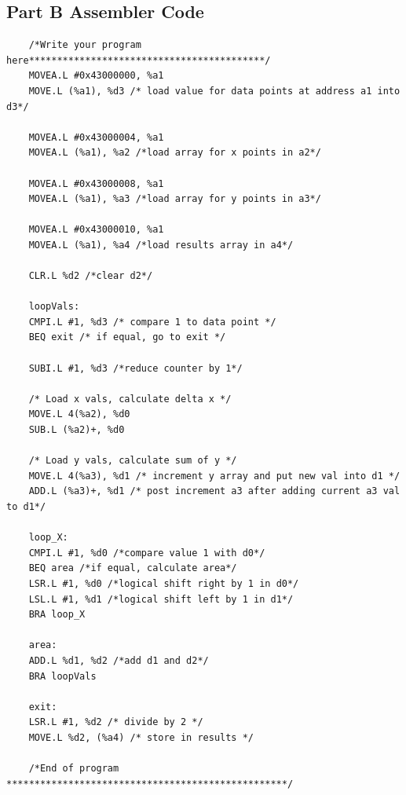 \documentclass[10pt, letterpaper, titlepage]{article} %
\begin{document}
\subsection{Part B Assembler Code}
\begin{lstlisting}
	/*Write your program here******************************************/
	MOVEA.L #0x43000000, %a1 
	MOVE.L (%a1), %d3 /* load value for data points at address a1 into d3*/
	
	MOVEA.L #0x43000004, %a1
	MOVEA.L (%a1), %a2 /*load array for x points in a2*/
	
	MOVEA.L #0x43000008, %a1
	MOVEA.L (%a1), %a3 /*load array for y points in a3*/
	
	MOVEA.L #0x43000010, %a1
	MOVEA.L (%a1), %a4 /*load results array in a4*/
	
	CLR.L %d2 /*clear d2*/
	
	loopVals:
	CMPI.L #1, %d3 /* compare 1 to data point */
	BEQ exit /* if equal, go to exit */
	
	SUBI.L #1, %d3 /*reduce counter by 1*/
	
	/* Load x vals, calculate delta x */
	MOVE.L 4(%a2), %d0
	SUB.L (%a2)+, %d0
	
	/* Load y vals, calculate sum of y */
	MOVE.L 4(%a3), %d1 /* increment y array and put new val into d1 */ 
	ADD.L (%a3)+, %d1 /* post increment a3 after adding current a3 val to d1*/
	
	loop_X:
	CMPI.L #1, %d0 /*compare value 1 with d0*/
	BEQ area /*if equal, calculate area*/
	LSR.L #1, %d0 /*logical shift right by 1 in d0*/
	LSL.L #1, %d1 /*logical shift left by 1 in d1*/
	BRA loop_X
	
	area:
	ADD.L %d1, %d2 /*add d1 and d2*/
	BRA loopVals 
	
	exit:
	LSR.L #1, %d2 /* divide by 2 */
	MOVE.L %d2, (%a4) /* store in results */
	
	/*End of program **************************************************/
\end{lstlisting}
\end{document}
